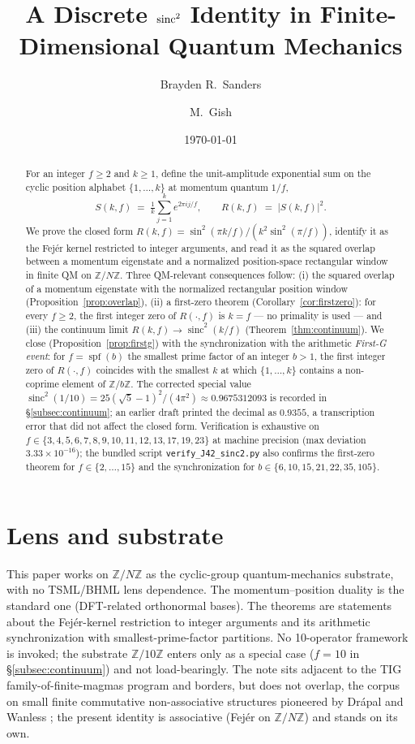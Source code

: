 \documentclass[11pt,reqno]{amsart}
\title[A discrete $\sinc^{2}$ identity in finite-dimensional QM]
{A Discrete $\sinc^{2}$ Identity in Finite-Dimensional Quantum Mechanics}
\author{Brayden R.\ Sanders}
\author{M.\ Gish}
\date{\today}
\theoremstyle{plain}
\theoremstyle{definition}
\theoremstyle{remark}
\newcommand{\Z}{\mathbb{Z}}
\newcommand{\spf}{\operatorname{spf}}
\DeclareMathOperator{\sinc}{sinc}
\begin{document}
\begin{abstract}
For an integer $f \ge 2$ and $k \ge 1$, define the unit-amplitude exponential sum on the
cyclic position alphabet $\{1,\dots,k\}$ at momentum quantum $1/f$,
\[
  S(k,f) \;=\; \tfrac{1}{k}\sum_{j=1}^{k} e^{2\pi i j / f},
  \qquad R(k,f) \;=\; |S(k,f)|^{2}.
\]
We prove the closed form $R(k,f) = \sin^{2}(\pi k/f)/(k^{2}\sin^{2}(\pi/f))$, identify it
as the Fej\'er kernel restricted to integer arguments, and read it as the squared overlap
between a momentum eigenstate and a normalized position-space rectangular window in finite
QM on $\Z/N\Z$. Three QM-relevant consequences follow: (i) the squared overlap of a
momentum eigenstate with the normalized rectangular position window
(Proposition~\ref{prop:overlap}), (ii) a first-zero theorem
(Corollary~\ref{cor:firstzero}): for every $f \ge 2$, the first integer zero of
$R(\cdot,f)$ is $k = f$ --- no primality is used --- and (iii) the continuum limit
$R(k,f) \to \sinc^{2}(k/f)$ (Theorem~\ref{thm:continuum}). We close
(Proposition~\ref{prop:firstg}) with the synchronization with the arithmetic
\emph{First-G event}: for $f = \spf(b)$ the smallest prime factor of an integer $b > 1$,
the first integer zero of $R(\cdot,f)$ coincides with the smallest $k$ at which
$\{1,\dots,k\}$ contains a non-coprime element of $\Z/b\Z$. The corrected special value
$\sinc^{2}(1/10) = 25(\sqrt{5}-1)^{2}/(4\pi^{2}) \approx 0.9675312093$ is recorded in
\S\ref{subsec:continuum}; an earlier draft printed the decimal as $0.9355$, a transcription
error that did not affect the closed form. Verification is exhaustive on
$f \in \{3,4,5,6,7,8,9,10,11,12,13,17,19,23\}$ at machine precision (max deviation
$3.33 \times 10^{-16}$); the bundled script \texttt{verify\_J42\_sinc2.py} also confirms
the first-zero theorem for $f \in \{2,\dots,15\}$ and the synchronization for
$b \in \{6,10,15,21,22,35,105\}$.
\end{abstract}

\maketitle

\section*{Lens and substrate}
\label{sec:lens}

This paper works on $\Z/N\Z$ as the cyclic-group quantum-mechanics substrate, with no
TSML/BHML lens dependence. The momentum--position duality is the standard one (DFT-related
orthonormal bases). The theorems are statements about the Fej\'er-kernel restriction to
integer arguments and its arithmetic synchronization with smallest-prime-factor
partitions. No 10-operator framework is invoked; the substrate $\Z/10\Z$ enters only as a
special case ($f = 10$ in \S\ref{subsec:continuum}) and not load-bearingly. The note sits
adjacent to the TIG family-of-finite-magmas program \cite{SandersGishFourCore} and
borders, but does not overlap, the corpus on small finite commutative non-associative
structures pioneered by Dr\'apal and Wanless \cite{DrapalWanless2021}; the present
identity is associative (Fej\'er on $\Z/N\Z$) and stands on its own.
\end{document}
